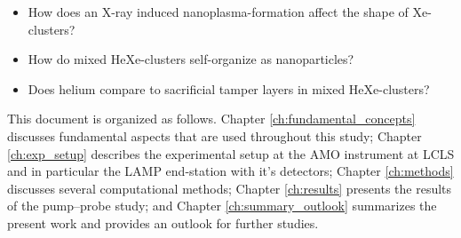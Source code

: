 \begin{itemize}
	\item How does an X-ray induced nanoplasma-formation affect the shape of Xe-clusters?
	\item How do mixed HeXe-clusters self-organize as nanoparticles?
	\item Does helium compare to sacrificial tamper layers in mixed HeXe-clusters?
\end{itemize}
%
This document is organized as follows. Chapter \ref{ch:fundamental_concepts} discusses fundamental aspects that are used throughout this study; Chapter \ref{ch:exp_setup} describes the experimental setup at the AMO instrument at LCLS and in particular the LAMP end-station with it's detectors; Chapter \ref{ch:methods} discusses several computational methods; Chapter \ref{ch:results} presents the results of the pump--probe study; and Chapter \ref{ch:summary_outlook} summarizes the present work and provides an outlook for further studies.
%
%
%
